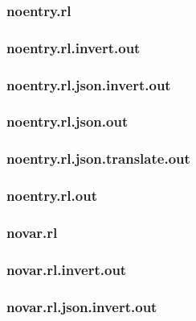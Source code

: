 \subsubsection{noentry.rl}
\label{app:noentry_rl}

\subsubsection{noentry.rl.invert.out}
\label{app:noentry_rl.invert.out}

\subsubsection{noentry.rl.json.invert.out}
\label{app:noentry_rl.json.invert.out}

\subsubsection{noentry.rl.json.out}
\label{app:noentry_rl.json.out}

\subsubsection{noentry.rl.json.translate.out}
\label{app:noentry_rl.json.translate.out}

\subsubsection{noentry.rl.out}
\label{app:noentry_rl.out}

\subsubsection{novar.rl}
\label{app:novar_rl}

\subsubsection{novar.rl.invert.out}
\label{app:novar_rl.invert.out}

\subsubsection{novar.rl.json.invert.out}
\label{app:novar_rl.json.invert.out}

